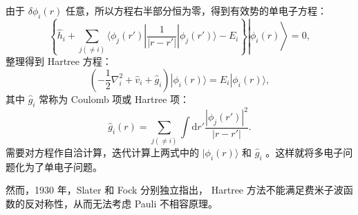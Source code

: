 由于 $\delta\phi_i(r)$ 任意，所以方程右半部分恒为零，得到有效势的单电子方程：
\begin{equation}
\left.\left.\left\{\hat{h}_i+\sum_{j(\ne i)}\langle\phi_j(r')|\frac{1}{|r-r'|}|\phi_j(r') \rangle-E_i \right\} \right|\phi_i(r) \right\rangle=0,
\end{equation}
整理得到 Hartree 方程：
\begin{equation}
\left(-\frac{1}{2}\nabla_i^2+\hat{v}_i+\hat{g}_i \right)|\phi_i(r)\rangle=E_i|\phi_i(r)\rangle,
\end{equation}
其中 $\hat{g}_i$ 常称为 Coulomb 项或 Hartree 项：
\begin{equation}
\hat{g}_i(r)=\sum_{j(\ne i)}\int\mathrm d r'\frac{|\phi_j(r')|^2}{|r-r'|}.
\end{equation}
需要对方程作自洽计算，迭代计算上两式中的 $|\phi_i(r)\rangle$ 和 $\hat{g}_i$ 。这样就将多电子问题化为了单电子问题。

然而，1930 年，Slater 和 Fock 分别独立指出， Hartree 方法不能满足费米子波函数的反对称性，从而无法考虑 Pauli 不相容原理\cite{PhysRev.35.210.2, Fock1930}。
